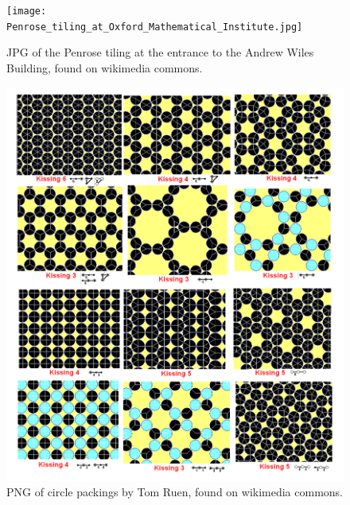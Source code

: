 \documentclass{article}
\begin{document}
\begin{figure}
\texttt{[image: Penrose\_tiling\_at\_Oxford\_Mathematical\_Institute.jpg]}
\caption{JPG of the Penrose tiling at the entrance to the Andrew Wiles Building, found on wikimedia commons.}
\end{figure}
\begin{figure}
\includegraphics{Uniform_tiling_circle_packings.png}
\caption{PNG of circle packings by Tom Ruen, found on wikimedia commons.}
\end{figure}
\end{document}
